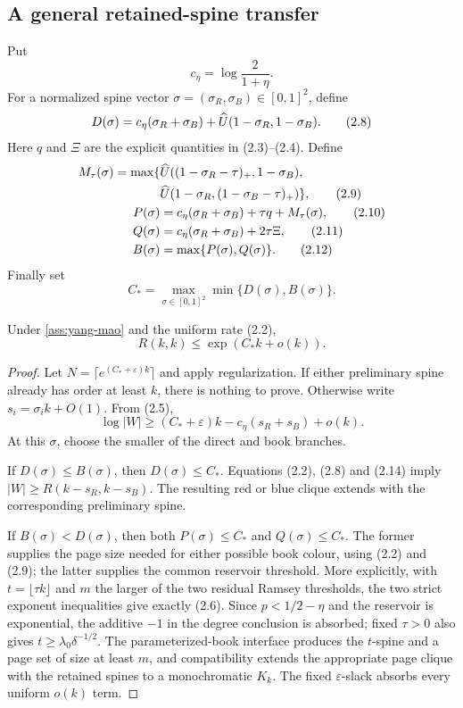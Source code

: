 \subsection{A general retained-spine transfer}

Put
\[
 c_\eta=\log\frac{2}{1+\eta}.
\]
For a normalized spine vector \(\sigma=(\sigma_R,\sigma_B)\in[0,1]^2\),
define
\[
 D(\sigma)=c_\eta(\sigma_R+\sigma_B)
 +\widehat U(1-\sigma_R,1-\sigma_B).
 \tag{2.8}
\]
Here \(q\) and \(\Xi\) are the explicit quantities in (2.3)--(2.4).  Define
\begin{align}
 M_\tau(\sigma)=\max\{&
 \widehat U((1-\sigma_R-\tau)_+,1-\sigma_B),\nonumber\\
 &\widehat U(1-\sigma_R,(1-\sigma_B-\tau)_+)\},\tag{2.9}\\
 P(\sigma)&=c_\eta(\sigma_R+\sigma_B)+\tau q+M_\tau(\sigma),\tag{2.10}\\
 Q(\sigma)&=c_\eta(\sigma_R+\sigma_B)+2\tau\Xi,\tag{2.11}\\
 B(\sigma)&=\max\{P(\sigma),Q(\sigma)\}.\tag{2.12}
\end{align}
Finally set
\[
 C_*=\max_{\sigma\in[0,1]^2}\min\{D(\sigma),B(\sigma)\}.
 \tag{2.13}
\]

\begin{theorem}\label{thm:transfer-general}
Under \cref{ass:yang-mao} and the uniform rate (2.2),
\[
 R(k,k)\le \exp(C_*k+o(k)).
\]
\end{theorem}

\begin{proof}
Let \(N=\lceil e^{(C_*+\varepsilon)k}\rceil\) and apply regularization.
If either preliminary spine already has order at least \(k\), there is
nothing to prove.  Otherwise write \(s_i=\sigma_i k+O(1)\).  From (2.5),
\[
 \log|W|\ge(C_*+\varepsilon)k
 -c_\eta(s_R+s_B)+o(k).
 \tag{2.14}
\]
At this \(\sigma\), choose the smaller of the direct and book branches.

If \(D(\sigma)\le B(\sigma)\), then \(D(\sigma)\le C_*\).  Equations
(2.2), (2.8) and (2.14) imply
\(|W|\ge R(k-s_R,k-s_B)\).  The resulting red or blue clique extends with
the corresponding preliminary spine.

If \(B(\sigma)<D(\sigma)\), then both \(P(\sigma)\le C_*\) and
\(Q(\sigma)\le C_*\).  The former supplies the page size needed for either
possible book colour, using (2.2) and (2.9); the latter supplies the common
reservoir threshold.  More explicitly, with \(t=\lfloor\tau k\rfloor\)
and \(m\) the larger of the two residual Ramsey thresholds, the two strict
exponent inequalities give exactly (2.6).  Since \(p<1/2-\eta\) and the
reservoir is exponential, the additive \(-1\) in the degree conclusion is
absorbed; fixed \(\tau>0\) also gives
\(t\ge\lambda_0\delta^{-1/2}\).  The parameterized-book interface produces
the \(t\)-spine and a page set of size at least \(m\), and compatibility
extends the appropriate page clique with the retained spines to a
monochromatic \(K_k\).  The fixed \(\varepsilon\)-slack absorbs every
uniform \(o(k)\) term.
\end{proof}
